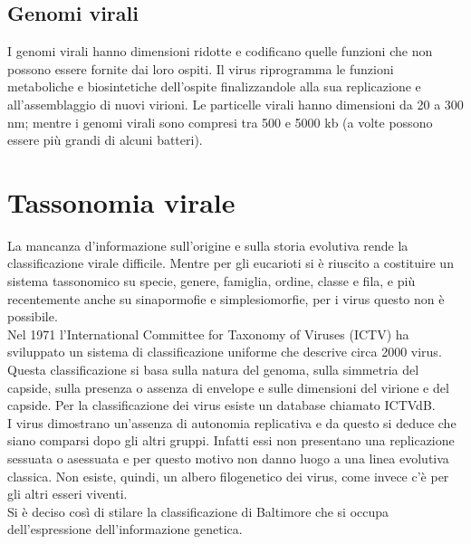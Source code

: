 \subsection{Genomi virali}
I genomi virali hanno dimensioni ridotte e codificano quelle funzioni che non possono essere fornite dai loro ospiti. Il virus riprogramma le funzioni metaboliche e biosintetiche dell'ospite finalizzandole alla sua replicazione e all'assemblaggio di nuovi virioni. Le particelle virali hanno dimensioni da 20 a 300 nm; mentre i genomi virali sono compresi tra 500 e 5000 kb (a volte possono essere pi\`u grandi di alcuni batteri).
\section{Tassonomia virale}
La mancanza d'informazione sull'origine e sulla storia evolutiva rende la classificazione virale difficile. Mentre per gli eucarioti si \`e riuscito a costituire un sistema tassonomico su specie, genere, famiglia, ordine, classe e fila, e pi\`u recentemente anche su sinapormofie e simplesiomorfie, per i virus questo non \`e possibile.
\\Nel 1971 l'International Committee for Taxonomy of Viruses (ICTV) ha sviluppato un sistema di classificazione uniforme che descrive circa 2000 virus. Questa classificazione si basa sulla natura del genoma, sulla simmetria del capside, sulla presenza o assenza di envelope e sulle dimensioni del virione e del capside. Per la classificazione dei virus esiste un database chiamato ICTVdB.
\\I virus dimostrano un'assenza di autonomia replicativa e da questo si deduce che siano comparsi dopo gli altri gruppi. Infatti essi non presentano una replicazione sessuata o asessuata e per questo motivo non danno luogo a una linea evolutiva classica. Non esiste, quindi, un albero filogenetico dei virus, come invece c'\`e per gli altri esseri viventi. 
\\Si \`e deciso cos\`i di stilare la classificazione di Baltimore che si occupa dell'espressione dell'informazione genetica. 
